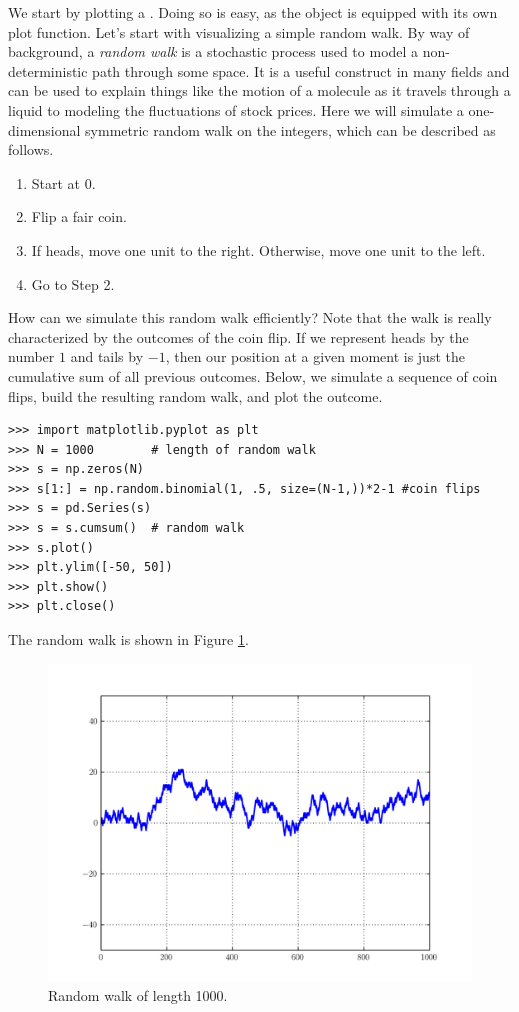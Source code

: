 We start by plotting a . Doing so is easy, as the  object is equipped with its own plot
function.
Let's start with visualizing a simple random walk. By way of background, a \emph{random walk} is a
stochastic process used to model a non-deterministic path through some space. It is a useful construct in
many fields and can be used to explain things like the motion of a molecule as it travels through a liquid to modeling the fluctuations
of stock prices. Here we will simulate a one-dimensional symmetric random walk on the integers, which can be
described as follows.
\begin{enumerate}
  \item Start at 0.
  \item Flip a fair coin.
  \item If heads, move one unit to the right. Otherwise, move one unit to the left.
  \item Go to Step 2.
\end{enumerate}
How can we simulate this random walk efficiently? Note that the walk is really characterized by the outcomes
of the coin flip. If we represent heads by the number $1$ and tails by $-1$, then our position at a given moment
is just the cumulative sum of all previous outcomes. Below, we simulate a sequence of coin flips, build the
resulting random walk, and plot the outcome.
\begin{lstlisting}
>>> import matplotlib.pyplot as plt
>>> N = 1000        # length of random walk
>>> s = np.zeros(N)
>>> s[1:] = np.random.binomial(1, .5, size=(N-1,))*2-1 #coin flips
>>> s = pd.Series(s)
>>> s = s.cumsum()  # random walk
>>> s.plot()
>>> plt.ylim([-50, 50])
>>> plt.show()
>>> plt.close()
\end{lstlisting}

The random walk is shown in Figure \ref{fig:PandasRandomWalk}.

\begin{figure}
\centering
\includegraphics[width=.7 \textwidth]{randomWalk.pdf}
\caption{Random walk of length 1000.}
\label{fig:PandasRandomWalk}
\end{figure}

